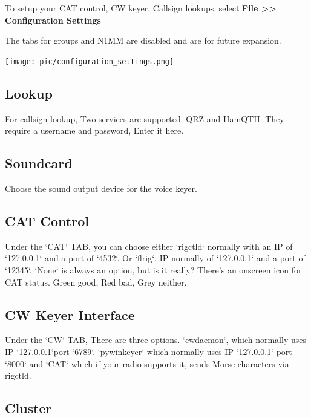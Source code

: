 \documentclass{article}
\begin{document}
To setup your CAT control, CW keyer, Callsign lookups,
select \textbf{File >> Configuration Settings}

The tabs for groups and N1MM are disabled and are for future expansion.

\vspace{0.5cm}
\texttt{[image: pic/configuration\_settings.png]}
\vspace{0.5cm}

\subsection{Lookup}

For callsign lookup, Two services are supported. QRZ and HamQTH. They require a username and password, Enter it here.

\subsection{Soundcard}

Choose the sound output device for the voice keyer.

\subsection{CAT Control}

Under the `CAT` TAB, you can choose either `rigctld` normally with an IP of `127.0.0.1` and a port of `4532`. Or `flrig`, IP normally of `127.0.0.1` and a port of `12345`. `None` is always an option, but is it really? There's an onscreen icon for CAT status. Green good, Red bad, Grey neither.

\subsection{CW Keyer Interface}

Under the `CW` TAB, There are three options. `cwdaemon`, which normally uses IP `127.0.0.1`port `6789`. `pywinkeyer` which normally uses IP `127.0.0.1` port `8000` and `CAT` which if your radio supports it, sends Morse characters via rigctld.

\subsection{Cluster}
\end{document}
